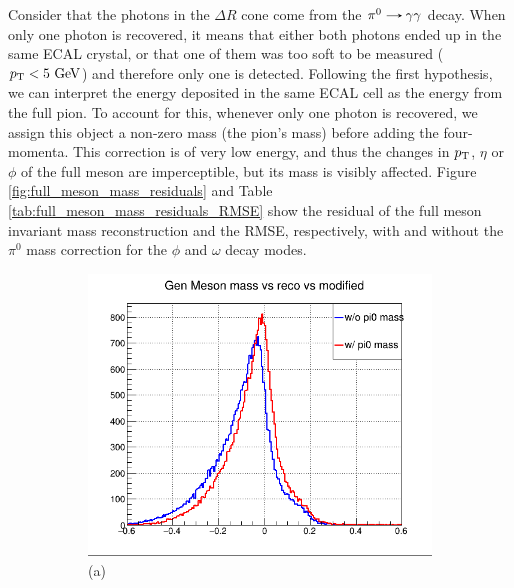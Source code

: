 \begin{myitemlist}
    Consider that the photons in the $\Delta R$ cone come from the $\pi^{0}\decaysto\gamma\gamma$ decay. When only one photon is recovered, it means that either both photons ended up in the same ECAL crystal, or that one of them was too soft to be measured ($p_\text{T} < 5\ \text{GeV}$) and therefore only one is detected. Following the first hypothesis, we can interpret the energy deposited in the same ECAL cell as the energy from the full pion. To account for this, whenever only one photon is recovered, we assign this object a non-zero mass (the pion's mass) before adding the four-momenta. This correction is of very low energy, and thus the changes in $p_\text{T}$, $\eta$ or $\phi$ of the full meson are imperceptible, but its mass is visibly affected. Figure \ref{fig:full_meson_mass_residuals} and Table \ref{tab:full_meson_mass_residuals_RMSE} show the residual of the full meson invariant mass reconstruction and the RMSE, respectively, with and without the $\pi^0$ mass correction for the $\phi$ and $\omega$ decay modes.
    \begin{figure}[!ht]
        \captionsetup[subfigure]{labelformat=empty}
        \vspace*{-0.2cm}
        \centering
        \setlength{\mylength}{\textwidth}
        \begin{subfigure}[t]{0.50\mylength}
                \centering
                \includegraphics[width=0.45\mylength]{resources/plots/fullmeson_mass_residual_phi.png}
                \caption{\footnotesize (a)}
        \end{subfigure}%
        \begin{subfigure}[t]{0.50\mylength}

\end{subfigure}
\end{figure}
\end{myitemlist}
